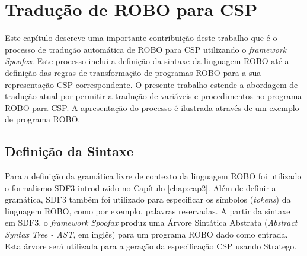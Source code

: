 \chapter{Tradução de ROBO para CSP}
\label{chap:cap3}

Este capítulo descreve uma importante contribuição deste trabalho que é o processo de tradução automática de ROBO para CSP utilizando o \textit{framework} \textit{Spoofax}. Este processo inclui a definição da sintaxe da linguagem ROBO até a definição das regras de transformação de programas ROBO para a sua representação CSP correspondente. O presente trabalho estende a abordagem de tradução atual por permitir a tradução de variáveis e procedimentos no programa ROBO para CSP.  A apresentação do processo é ilustrada através de um exemplo de programa ROBO.


\section{Definição da Sintaxe}
Para a definição da gramática livre de contexto da linguagem ROBO foi utilizado o formalismo SDF3 introduzido no Capítulo \ref{chap:cap2}. Além de definir a gramática, SDF3 também foi utilizado para especificar os símbolos (\textit{tokens}) da linguagem ROBO, como por exemplo, palavras reservadas. A partir da sintaxe em SDF3, o \textit{framework} \textit{Spoofax} produz uma Árvore Sintática Abstrata (\textit{Abstract Syntax Tree - AST}, em inglês) para um programa ROBO dado como entrada. Esta árvore será utilizada para a geração da especificação CSP usando Stratego.

